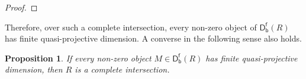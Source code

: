 \documentclass[10pt, a4paper,reqno]{amsart}
\newtheorem{prop}[prop]{Proposition}
\theoremstyle{definition}
\theoremstyle{remark}
\numberwithin{equation}{thm}
\def\sH{\mathsf{H}}
\def\Ker{\operatorname{\mathsf{Ker}}}
\def\Im{\operatorname{\mathsf{Im}}}
\def\Tot{\operatorname{\mathsf{Tot}}}
\def\Dfb{\mathsf{D^f_b}}
\newcommand{\mdot}{%
  \mathbin{\vcenter{\hbox{\scalebox{0.5}{$\bullet$}}}}%
}
\begin{document}
\begin{proof}

\end{proof}


Therefore, over such a complete intersection, every non-zero object of $\Dfb(R)$ has finite quasi-projective dimension.
A converse in the following sense also holds.

\begin{prop}
If every non-zero object	 $M \in \Dfb(R)$ has finite quasi-projective dimension, then $R$ is a complete intersection.
\end{prop}
\end{document}

